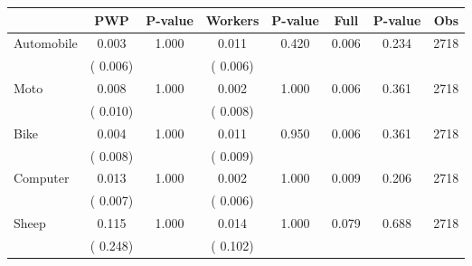 
\begin{tabular}{l*{7}{c}}\hline&\multicolumn{1}{c}{PWP}&\multicolumn{1}{c}{P-value}&\multicolumn{1}{c}{Workers}&\multicolumn{1}{c}{P-value}&\multicolumn{1}{c}{Full}&\multicolumn{1}{c}{P-value}&\multicolumn{1}{c}{Obs} \\ \hline

 Automobile       &              0.003       &        1.000  &              0.011       &        0.420  &              0.006       &              0.234 &  2718 \\ 
                       &       (       0.006)             &                               &       (       0.006)                     &                               &                                               &                                &                      \\ 

 Moto       &              0.008       &        1.000  &              0.002       &        1.000  &              0.006       &              0.361 &  2718 \\ 
                       &       (       0.010)             &                               &       (       0.008)                     &                               &                                               &                                &                      \\ 

 Bike       &              0.004       &        1.000  &              0.011       &        0.950  &              0.006       &              0.361 &  2718 \\ 
                       &       (       0.008)             &                               &       (       0.009)                     &                               &                                               &                                &                      \\ 

 Computer       &              0.013       &        1.000  &              0.002       &        1.000  &              0.009       &              0.206 &  2718 \\ 
                       &       (       0.007)             &                               &       (       0.006)                     &                               &                                               &                                &                      \\ 

 Sheep       &              0.115       &        1.000  &              0.014       &        1.000  &              0.079       &              0.688 &  2718 \\ 
                       &       (       0.248)             &                               &       (       0.102)                     &                               &                                               &                                &                      \\ 


\end{tabular}
